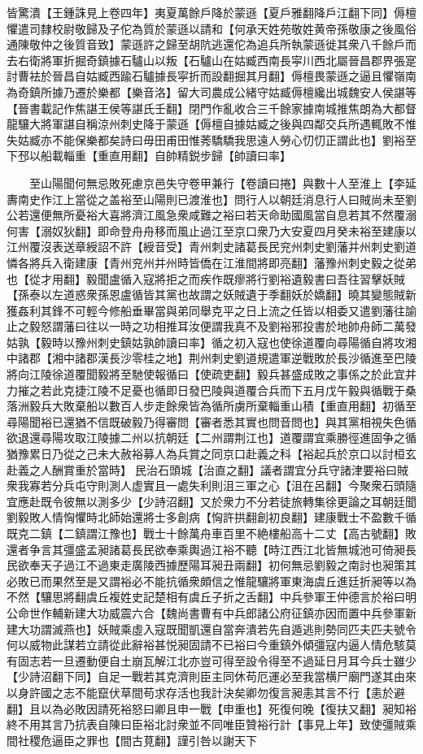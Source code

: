 皆驚潰【王鍾誅見上卷四年】夷夏萬餘戶降於蒙遜【夏戶雅翻降戶江翻下同】傉檀懼遣司隸校尉敬歸及子佗為質於蒙遜以請和【何承天姓苑敬姓黄帝孫敬康之後風俗通陳敬仲之後質音致】蒙遜許之歸至胡阬逃還佗為追兵所執蒙遜徙其衆八千餘戶而去右衛將軍折掘奇鎮據石驢山以叛【石驢山在姑臧西南長寜川西北屬晉昌郡界張寔討曹袪於晉昌自姑臧西踰石驢據長寜折而設翻掘其月翻】傉檀畏蒙遜之逼且懼嶺南為奇鎮所據乃遷於樂都【樂音洛】留大司農成公緒守姑臧傉檀纔出城魏安人侯諶等【晉書載記作焦諶王侯等諶氏壬翻】閉門作亂收合三千餘家據南城推焦朗為大都督龍驤大將軍諶自稱涼州刺史降于蒙遜【傉檀自據姑臧之後與四鄰交兵所遇輒敗不惟失姑臧亦不能保樂都矣詩曰毋田甫田惟莠驕驕我思遠人勞心忉忉正謂此也】劉裕至下邳以船載輜重【重直用翻】自帥精鋭步歸【帥讀曰率】

　　至山陽聞何無忌敗死慮京邑失守卷甲兼行【卷讀曰捲】與數十人至淮上【李延夀南史作江上當從之盖裕至山陽則已渡淮也】問行人以朝廷消息行人曰賊尚未至劉公若還便無所憂裕大喜將濟江風急衆咸難之裕曰若天命助國風當自息若其不然覆溺何害【溺奴狄翻】即命登舟舟移而風止過江至京口衆乃大安夏四月癸未裕至建康以江州覆沒表送章綬詔不許【綬音受】青州刺史諸葛長民兖州刺史劉藩并州刺史劉道憐各將兵入衛建康【青州兖州并州時皆僑在江淮間將即亮翻】藩豫州刺史毅之從弟也【從才用翻】毅聞盧循入寇將拒之而疾作既瘳將行劉裕遺毅書曰吾往習擊妖賊【孫泰以左道惑衆孫恩盧循皆其黨也故謂之妖賊遺于季翻妖於嬌翻】曉其變態賊新獲姦利其鋒不可輕今修船垂畢當與弟同舉克平之日上流之任皆以相委又遣劉藩往諭止之毅怒謂藩曰往以一時之功相推耳汝便謂我真不及劉裕邪投書於地帥舟師二萬發姑孰【毅時以豫州刺史鎮姑孰帥讀曰率】循之初入寇也使徐道覆向尋陽循自將攻湘中諸郡【湘中諸郡漢長沙零桂之地】荆州刺史劉道規遣軍逆戰敗於長沙循進至巴陵將向江陵徐道覆聞毅將至馳使報循曰【使疏吏翻】毅兵甚盛成敗之事係之於此宜并力摧之若此克捷江陵不足憂也循即日發巴陵與道覆合兵而下五月戊午毅與循戰于桑落洲毅兵大敗棄船以數百人步走餘衆皆為循所虜所棄輜重山積【重直用翻】初循至尋陽聞裕已還猶不信既破毅乃得審問【審者悉其實也問音問也】與其黨相視失色循欲退還尋陽攻取江陵據二州以抗朝廷【二州謂荆江也】道覆謂宜乘勝徑進固争之循猶豫累日乃從之己未大赦裕募人為兵賞之同京口赴義之科【裕起兵於京口以討桓玄赴義之人酬賞重於當時】民治石頭城【治直之翻】議者謂宜分兵守諸津要裕曰賊衆我寡若分兵屯守則測人虚實且一處失利則沮三軍之心【沮在呂翻】今聚衆石頭隨宜應赴既令彼無以測多少【少詩沼翻】又於衆力不分若徒旅轉集徐更論之耳朝廷聞劉毅敗人情恟懼時北師始還將士多創病【恟許拱翻創初良翻】建康戰士不盈數千循既克二鎮【二鎮謂江豫也】戰士十餘萬舟車百里不絶樓船高十二丈【高古號翻】敗還者争言其彊盛孟昶諸葛長民欲奉乘輿過江裕不聽【時江西江北皆無城池可倚昶長民欲奉天子過江不過東走廣陵西據歷陽耳昶丑兩翻】初何無忌劉毅之南討也昶策其必敗已而果然至是又謂裕必不能抗循衆頗信之惟龍驤將軍東海虞丘進廷折昶等以為不然【驤思將翻虞丘複姓史記楚相有虞丘子折之舌翻】中兵參軍王仲德言於裕曰明公命世作輔新建大功威震六合【魏尚書曹有中兵郎諸公府征鎮亦因而置中兵參軍新建大功謂滅燕也】妖賊乘虛入寇既聞凱還自當奔潰若先自遁逃則勢同匹夫匹夫號令何以威物此謀若立請從此辭裕甚悦昶固請不已裕曰今重鎮外傾彊寇内逼人情危駭莫有固志若一旦遷動便自土崩瓦解江北亦豈可得至設令得至不過延日月耳今兵士雖少【少詩沼翻下同】自足一戰若其克濟則臣主同休苟厄運必至我當横尸廟門遂其由來以身許國之志不能竄伏草間苟求存活也我計決矣卿勿復言昶恚其言不行【恚於避翻】且以為必敗因請死裕怒曰卿且申一戰【申重也】死復何晚【復扶又翻】昶知裕終不用其言乃抗表自陳曰臣裕北討衆並不同唯臣贊裕行計【事見上年】致使彊賊乘間社稷危逼臣之罪也【間古莧翻】謹引咎以謝天下